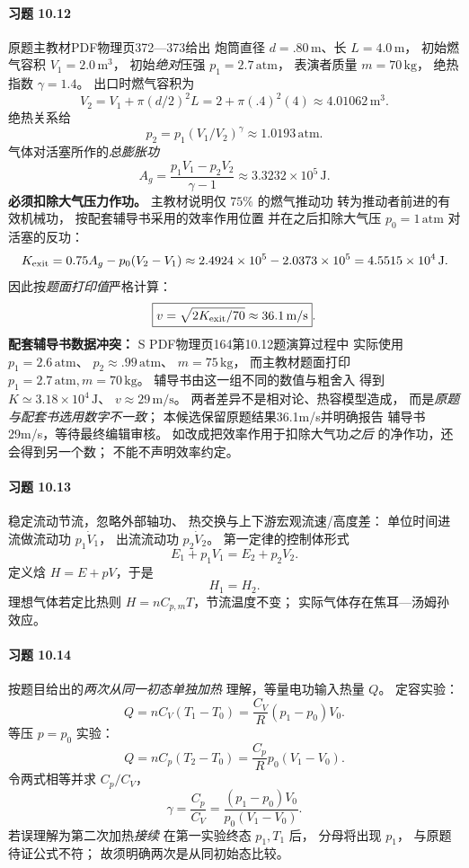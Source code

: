 \paragraph{习题 10.12}
原题主教材PDF物理页372—373给出
炮筒直径 \(d=.80\,\mathrm m\)、长
\(L=4.0\,\mathrm m\)，
初始燃气容积 \(V_1=2.0\,\mathrm{m^3}\)，
初始\emph{绝对}压强
\(p_1=2.7\,\mathrm{atm}\)，
表演者质量 \(m=70\,\mathrm{kg}\)，
绝热指数 \(\gamma=1.4\)。
出口时燃气容积为
\[
 V_2=V_1+\pi(d/2)^2L
 =2+\pi(.4)^2(4)
 \approx4.01062\,\mathrm{m^3}.
\]
绝热关系给
\[
 p_2=p_1(V_1/V_2)^\gamma
 \approx1.0193\,\mathrm{atm}.
\]
气体对活塞所作的\emph{总膨胀功}
\[
 A_g=\frac{p_1V_1-p_2V_2}{\gamma-1}
 \approx3.3232\times10^5\,\mathrm J.
\]
\textbf{必须扣除大气压力作功。}
主教材说明仅 \(75\%\) 的燃气推动功
转为推动者前进的有效机械功，
按配套辅导书采用的效率作用位置
并在之后扣除大气压 \(p_0=1\,\mathrm{atm}\)
对活塞的反功：
\[
 K_{\rm exit}=0.75A_g-p_0(V_2-V_1)
 \approx2.4924\times10^5-2.0373\times10^5
 =4.5515\times10^4\,\mathrm J.
\]
因此按\emph{题面打印值}严格计算：
\[
 \boxed{v=\sqrt{2K_{\rm exit}/70}
 \approx36.1\,\mathrm{m/s}}.
\]
\textbf{配套辅导书数据冲突：}
S PDF物理页164第10.12题演算过程中
实际使用 \(p_1=2.6\,\mathrm{atm}\)、
\(p_2\approx.99\,\mathrm{atm}\)、
\(m=75\,\mathrm{kg}\)，
而主教材题面打印
\(p_1=2.7\,\mathrm{atm},m=70\,\mathrm{kg}\)。
辅导书由这一组不同的数值与粗舍入
得到 \(K\simeq3.18\times10^4\,\mathrm J\)、
\(v\approx29\,\mathrm{m/s}\)。
两者差异不是相对论、热容模型造成，
而是\emph{原题与配套书选用数字不一致}；
本候选保留原题结果36.1m/s并明确报告
辅导书29m/s，等待最终编辑审核。
如改成把效率作用于扣除大气功\emph{之后}
的净作功，还会得到另一个数；
不能不声明效率约定。

\paragraph{习题 10.13}
稳定流动节流，忽略外部轴功、
热交换与上下游宏观流速/高度差：
单位时间进流做流动功 \(p_1\dot V_1\)，
出流流动功 \(p_2\dot V_2\)。
第一定律的控制体形式
\[
 E_1+p_1V_1=E_2+p_2V_2.
\]
定义焓
\(H=E+pV\)，于是
\[
 \boxed{H_1=H_2}.
\]
理想气体若定比热则
\(H=nC_{p,m}T\)，节流温度不变；
实际气体存在焦耳—汤姆孙效应。

\paragraph{习题 10.14}
按题目给出的\emph{两次从同一初态单独加热}
理解，等量电功输入热量 \(Q\)。
定容实验：
\[
 Q=nC_V(T_1-T_0)
 =\frac{C_V}{R}(p_1-p_0)V_0.
\]
等压 \(p=p_0\) 实验：
\[
 Q=nC_p(T_2-T_0)
 =\frac{C_p}{R}p_0(V_1-V_0).
\]
令两式相等并求 \(C_p/C_V\)，
\[
 \boxed{\gamma=\frac{C_p}{C_V}
 =\frac{(p_1-p_0)V_0}{p_0(V_1-V_0)}}.
\]
若误理解为第二次加热\emph{接续}
在第一实验终态 \(p_1,T_1\) 后，
分母将出现 \(p_1\)，
与原题待证公式不符；
故须明确两次是从同初始态比较。


